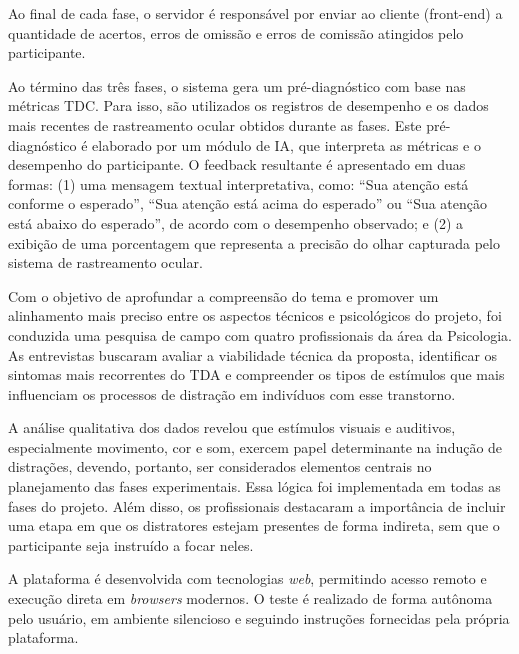 Ao final de cada fase, o servidor é responsável por enviar ao cliente (front-end) a quantidade de acertos, erros de omissão e erros de comissão atingidos pelo participante.

Ao término das três fases, o sistema gera um pré-diagnóstico com base nas métricas TDC. Para isso, são utilizados os registros de desempenho e os dados mais recentes de rastreamento ocular obtidos durante as fases. Este pré-diagnóstico é elaborado por um módulo de IA, que interpreta as métricas e o desempenho do participante. O feedback resultante é apresentado em duas formas: (1) uma mensagem textual interpretativa, como: “Sua atenção está conforme o esperado”, “Sua atenção está acima do esperado” ou “Sua atenção está abaixo do esperado”, de acordo com o desempenho observado; e (2) a exibição de uma porcentagem que representa a precisão do olhar capturada pelo sistema de rastreamento ocular.

Com o objetivo de aprofundar a compreensão do tema e promover um alinhamento mais preciso entre os aspectos técnicos e psicológicos do projeto, foi conduzida uma pesquisa de campo com quatro profissionais da área da Psicologia. As entrevistas buscaram avaliar a viabilidade técnica da proposta, identificar os sintomas mais recorrentes do TDA e compreender os tipos de estímulos que mais influenciam os processos de distração em indivíduos com esse transtorno.

A análise qualitativa dos dados revelou que estímulos visuais e auditivos, especialmente movimento, cor e som, exercem papel determinante na indução de distrações, devendo, portanto, ser considerados elementos centrais no planejamento das fases experimentais. Essa lógica foi implementada em todas as fases do projeto.
Além disso, os profissionais destacaram a importância de incluir uma etapa em que os distratores estejam presentes de forma indireta, sem que o participante seja instruído a focar neles.

A plataforma é desenvolvida com tecnologias \textit{web}, permitindo acesso remoto e execução
direta em \textit{browsers} modernos. O teste é realizado de forma autônoma pelo usuário, em ambiente silencioso e seguindo instruções fornecidas pela própria plataforma.

